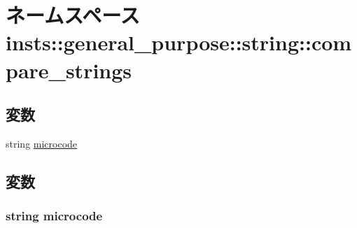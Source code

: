 \hypertarget{namespaceinsts_1_1general__purpose_1_1string_1_1compare__strings}{
\section{ネームスペース insts::general\_\-purpose::string::compare\_\-strings}
\label{namespaceinsts_1_1general__purpose_1_1string_1_1compare__strings}
}
\subsection*{変数}
\begin{DoxyCompactItemize}
\item 
string \hyperlink{namespaceinsts_1_1general__purpose_1_1string_1_1compare__strings_a770f11a173e99389a8802f0107ed8f52}{microcode}
\end{DoxyCompactItemize}


\subsection{変数}
\hypertarget{namespaceinsts_1_1general__purpose_1_1string_1_1compare__strings_a770f11a173e99389a8802f0107ed8f52}{
\subsubsection[{microcode}]{\setlength{\rightskip}{0pt plus 5cm}string {\bf microcode}}}
\label{namespaceinsts_1_1general__purpose_1_1string_1_1compare__strings_a770f11a173e99389a8802f0107ed8f52}
